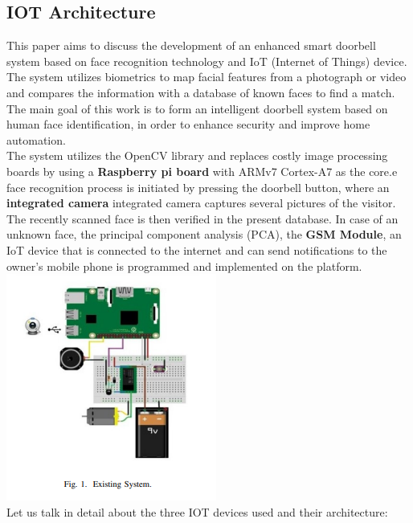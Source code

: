 \documentclass{report}
\begin{document}
\begin{multicols}{1} 
    \section{IOT Architecture}
    This paper aims to discuss the development of an enhanced smart doorbell system based on face recognition technology and IoT (Internet of Things) device. The system utilizes biometrics to map facial features from a photograph or video and compares the information with a database of known faces to find a match. The main goal of this work is to form an intelligent doorbell system based on human face identification, in order to enhance security and improve home automation.\\ 

    The system utilizes the OpenCV library and replaces costly image processing boards by using a \textbf{Raspberry pi board} with ARMv7 Cortex-A7 as the core.e face recognition process is initiated by pressing the doorbell button, where an \textbf{integrated camera} integrated camera captures several pictures of the visitor. The recently scanned face is then verified in the present database. In case of an unknown face, the {principal component analysis (PCA), the \textbf{GSM Module}, an IoT device that is connected to the internet and can send notifications to the owner's mobile phone is programmed and implemented on the platform.\\ 

    
        \includegraphics{images/doorbell.png}\\
        
    Let us talk in detail about the three IOT devices used and their architecture: \\
    
}
\end{multicols}
\end{document}
